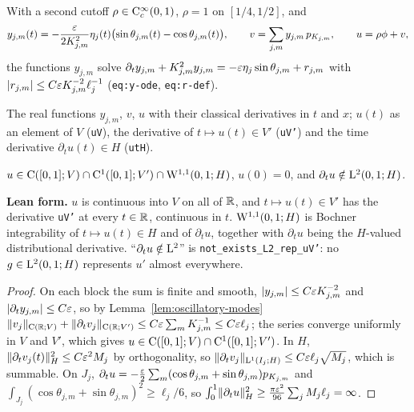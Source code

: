 With a second cutoff $\rho\in\mathrm{C}_c^\infty(0,1)$, $\rho=1$ on $[1/4,1/2]$, and
\[
  y_{j,m}(t)=-\frac{\varepsilon}{2K_{j,m}^2}\eta_j(t)\bigl(\sin\theta_{j,m}(t)-\cos\theta_{j,m}(t)\bigr),
  \qquad v=\sum_{j,m}y_{j,m}\,p_{K_{j,m}},\qquad u=\rho\phi+v,
\]
the functions $y_{j,m}$ solve $\partial_ty_{j,m}+K_{j,m}^2y_{j,m}=-\varepsilon\eta_j\sin\theta_{j,m}+r_{j,m}$
with $\lvert r_{j,m}\rvert\leq C\varepsilon K_{j,m}^{-2}\ell_j^{-1}$ (\texttt{eq:y-ode}, \texttt{eq:r-def}).

\begin{definition}
  \label{def:solution}
  \leanok
  The real functions $y_{j,m}$, $v$, $u$ with their classical derivatives in $t$ and $x$; $u(t)$ as
  an element of $V$ (\texttt{uV}), the derivative of $t\mapsto u(t)\in V'$ (\texttt{uV'}) and
  the time derivative $\partial_tu(t)\in H$ (\texttt{utH}).
\end{definition}

\begin{lemma}
  \label{lem:solution-regularity}
  \leanok
  $u\in\mathrm{C}([0,1];V)\cap\mathrm{C}^1([0,1];V')\cap\mathrm{W}^{1,1}(0,1;H)$, $u(0)=0$, and
  $\partial_tu\notin\mathrm{L}^2(0,1;H)$.
\end{lemma}

\textbf{Lean form.}  $u$ is continuous into $V$ on all of $\mathbb{R}$, and $t\mapsto u(t)\in V'$ has the
derivative \texttt{uV'} at every $t\in\mathbb{R}$, continuous in $t$.  $\mathrm{W}^{1,1}(0,1;H)$ is
Bochner integrability of $t\mapsto u(t)\in H$ and of $\partial_tu$, together with
$\partial_tu$ being the $H$-valued distributional derivative.  ``$\partial_tu\notin\mathrm{L}^2$'' is
\texttt{not\_exists\_L2\_rep\_uV'}: no $g\in\mathrm{L}^2(0,1;H)$ represents $u'$ almost everywhere.

\begin{proof}
  \leanok
  On each block the sum is finite and smooth, $\lvert y_{j,m}\rvert\leq C\varepsilon K_{j,m}^{-2}$ and
  $\lvert \partial_ty_{j,m}\rvert\leq C\varepsilon$, so by Lemma~\ref{lem:oscillatory-modes}
  $\lVert v_j\rVert_{\mathrm{C}(\mathbb{R};V)}+\lVert \partial_tv_j\rVert_{\mathrm{C}(\mathbb{R};V')}\leq C\varepsilon\sum_mK_{j,m}^{-1}\leq C\varepsilon\ell_j$;
  the series converge uniformly in $V$ and $V'$, which gives $u\in\mathrm{C}([0,1];V)\cap\mathrm{C}^1([0,1];V')$.
  In $H$, $\lVert \partial_tv_j(t)\rVert_H^2\leq C\varepsilon^2M_j$ by orthogonality, so
  $\lVert \partial_tv_j\rVert_{\mathrm{L}^1(I_j;H)}\leq C\varepsilon\ell_j\sqrt{M_j}$, which is summable.  On $J_j$,
  $\partial_tu=-\frac{\varepsilon}2\sum_m(\cos\theta_{j,m}+\sin\theta_{j,m})p_{K_{j,m}}$ and
  $\int_{J_j}(\cos\theta_{j,m}+\sin\theta_{j,m})^2\geq\ell_j/6$, so
  $\int_0^1\lVert \partial_tu\rVert_H^2\geq\frac{\pi\varepsilon^2}{96}\sum_jM_j\ell_j=\infty$.
\end{proof}
